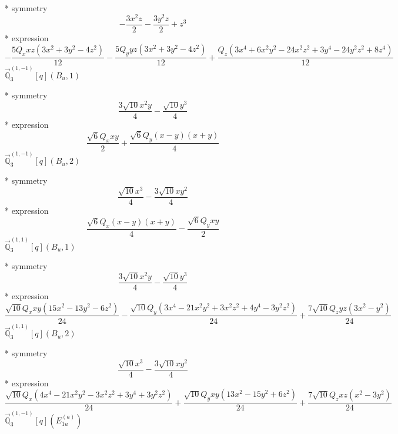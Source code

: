 \documentclass[fleqn,8pt]{jsarticle}
\begin{document}
\noindent\quad ** symmetry
\begin{dmath*}
- \frac{3 x^{2} z}{2} - \frac{3 y^{2} z}{2} + z^{3}
\end{dmath*}
\noindent\quad ** expression
\begin{dmath*}
- \frac{5 Q_{x} x z \left(3 x^{2} + 3 y^{2} - 4 z^{2}\right)}{12} - \frac{5 Q_{y} y z \left(3 x^{2} + 3 y^{2} - 4 z^{2}\right)}{12} + \frac{Q_{z} \left(3 x^{4} + 6 x^{2} y^{2} - 24 x^{2} z^{2} + 3 y^{4} - 24 y^{2} z^{2} + 8 z^{4}\right)}{12}
\end{dmath*}
\noindent\quad $\vec{\mathbb{Q}}_{3}^{(1,-1)}[q](B_{u},1)$

\noindent\quad ** symmetry
\begin{dmath*}
\frac{3 \sqrt{10} x^{2} y}{4} - \frac{\sqrt{10} y^{3}}{4}
\end{dmath*}
\noindent\quad ** expression
\begin{dmath*}
\frac{\sqrt{6} Q_{x} x y}{2} + \frac{\sqrt{6} Q_{y} \left(x - y\right) \left(x + y\right)}{4}
\end{dmath*}
\noindent\quad $\vec{\mathbb{Q}}_{3}^{(1,-1)}[q](B_{u},2)$

\noindent\quad ** symmetry
\begin{dmath*}
\frac{\sqrt{10} x^{3}}{4} - \frac{3 \sqrt{10} x y^{2}}{4}
\end{dmath*}
\noindent\quad ** expression
\begin{dmath*}
\frac{\sqrt{6} Q_{x} \left(x - y\right) \left(x + y\right)}{4} - \frac{\sqrt{6} Q_{y} x y}{2}
\end{dmath*}
\noindent\quad $\vec{\mathbb{Q}}_{3}^{(1,1)}[q](B_{u},1)$

\noindent\quad ** symmetry
\begin{dmath*}
\frac{3 \sqrt{10} x^{2} y}{4} - \frac{\sqrt{10} y^{3}}{4}
\end{dmath*}
\noindent\quad ** expression
\begin{dmath*}
\frac{\sqrt{10} Q_{x} x y \left(15 x^{2} - 13 y^{2} - 6 z^{2}\right)}{24} - \frac{\sqrt{10} Q_{y} \left(3 x^{4} - 21 x^{2} y^{2} + 3 x^{2} z^{2} + 4 y^{4} - 3 y^{2} z^{2}\right)}{24} + \frac{7 \sqrt{10} Q_{z} y z \left(3 x^{2} - y^{2}\right)}{24}
\end{dmath*}
\noindent\quad $\vec{\mathbb{Q}}_{3}^{(1,1)}[q](B_{u},2)$

\noindent\quad ** symmetry
\begin{dmath*}
\frac{\sqrt{10} x^{3}}{4} - \frac{3 \sqrt{10} x y^{2}}{4}
\end{dmath*}
\noindent\quad ** expression
\begin{dmath*}
\frac{\sqrt{10} Q_{x} \left(4 x^{4} - 21 x^{2} y^{2} - 3 x^{2} z^{2} + 3 y^{4} + 3 y^{2} z^{2}\right)}{24} + \frac{\sqrt{10} Q_{y} x y \left(13 x^{2} - 15 y^{2} + 6 z^{2}\right)}{24} + \frac{7 \sqrt{10} Q_{z} x z \left(x^{2} - 3 y^{2}\right)}{24}
\end{dmath*}
\noindent\quad $\vec{\mathbb{Q}}_{3}^{(1,-1)}[q](E_{1u}^{(a)})$
\end{document}
